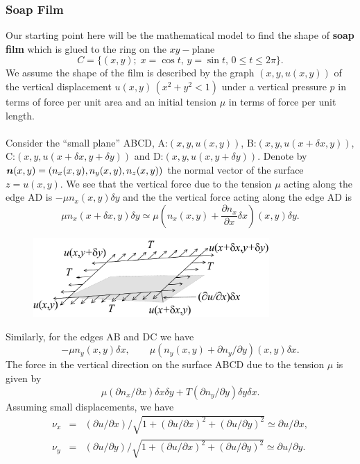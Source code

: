 \documentclass[a4paper,twoside,12pt]{book}
\def\vec#1{\mbox{\boldmath $#1$}}
\def\p{\partial}
\def\setS#1{#1\label{sec:#1}}
\begin{document}
\subsubsection{\setS{Soap Film}}
Our starting point here will be the mathematical model to find the shape of
\textbf{soap film} which is glued to the ring on the $xy-$plane
\begin{equation*}
C=\{(x,y);\;x=\cos t,\,y=\sin t,\,0\leq t\leq 2\pi \}.
\end{equation*}
We assume the shape of the film is described by the graph $(x,y,u(x,y))$ of the vertical
displacement $u(x,y)\, (x^2+y^2<1)$ under a vertical pressure $p$
in terms of force per unit area and an initial tension $\mu$ in terms of force
per unit length.
\\\\
Consider  the ``small plane'' ABCD, A:$(x,y,u(x,y))$, B:$(x,y,u(x+\delta x,y))$, C:$(x,y,u(x+\delta x,y+\delta y))$ and D:$(x,y,u(x,y+\delta y))$.
Denote by $\vec{n}(x,y)=(n_x(x,y),n_y(x,y),n_z(x,y))$ the normal vector of the surface $z=u(x,y)$.
We see that the vertical force due to the tension $\mu$ acting along the edge
AD is $-\mu n_x(x,y)\delta y$ and the the vertical force acting along the edge
AD is
\[
\mu n_x(x+\delta x,y)\delta y\simeq \mu\left(n_x(x,y)
+\frac{\p n_x}{\p x}\delta x\right)(x,y)\delta y.
\]
\begin{figure}[htbp]
\begin{center}
\includegraphics[height=3cm]{soapfilm}
\end{center}
\end{figure}
Similarly, for the edges AB and DC we have
\[
-\mu n_y(x,y)\delta x,\qquad
\mu\left(n_y(x,y)+\p n_y/\p y\right)(x,y)\delta x.
\]
The force in the vertical direction on the surface ABCD due to the tension $\mu$ is given by
\[
\mu\left(\p n_x/\p x\right)\delta x\delta y+T\left(\p n_y/\p y\right)\delta y\delta x.
\]
Assuming small displacements, we have
\begin{eqnarray*}
\nu_x&=&(\p u/\p x)/\sqrt{1+(\p u/\p x)^2+(\p u/\p y)^2}\simeq \p u/\p x,\\
\nu_y&=&(\p u/\p y)/\sqrt{1+(\p u/\p x)^2+(\p u/\p y)^2}\simeq \p u/\p y.
\end{eqnarray*}
\end{document}
